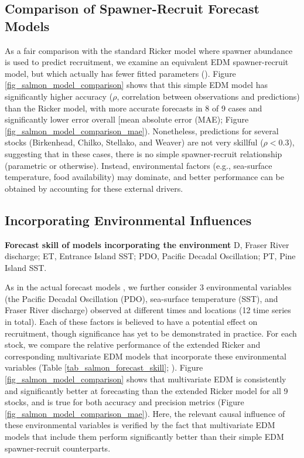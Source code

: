 \subsection{Comparison of Spawner-Recruit Forecast Models}

As a fair comparison with the standard Ricker model where spawner abundance is used to predict recruitment, we examine an equivalent EDM spawner-recruit model, but which actually has fewer fitted parameters (). Figure \ref{fig_salmon_model_comparison} shows that this simple EDM model has significantly higher accuracy ($\rho$, correlation between observations and predictions) than the Ricker model, with more accurate forecasts in 8 of 9 cases and significantly lower error overall [mean absolute error (MAE); Figure \ref{fig_salmon_model_comparison_mae}). Nonetheless, predictions for several stocks (Birkenhead, Chilko, Stellako, and Weaver) are not very skillful ($\rho < 0.3$), suggesting that in these cases, there is no simple spawner-recruit relationship (parametric or otherwise). Instead, environmental factors (e.g., sea-surface temperature, food availability) may dominate, and better performance can be obtained by accounting for these external drivers.

\subsection{Incorporating Environmental Influences}

\begin{table}
\caption[Forecast skill of models incorporating the environment]{\textbf{Forecast skill of models incorporating the environment}\newline
D, Fraser River discharge; ET, Entrance Island SST; PDO, Pacific Decadal Oscillation; PT, Pine Island SST.} \label{tab_salmon_forecast_skill}

\begin{center}

\end{center}
\end{table}

As in the actual forecast models \cite{Grant_2010}, we further consider 3 environmental variables (the Pacific Decadal Oscillation (PDO), sea-surface temperature (SST), and Fraser River discharge) observed at different times and locations (12 time series in total). Each of these factors is believed to have a potential effect on recruitment, though significance has yet to be demonstrated in practice. For each stock, we compare the relative performance of the extended Ricker and corresponding multivariate EDM models that incorporate these environmental variables (Table \ref{tab_salmon_forecast_skill}; ). Figure \ref{fig_salmon_model_comparison} shows that multivariate EDM is consistently and significantly better at forecasting than the extended Ricker model for all 9 stocks, and is true for both accuracy and precision metrics (Figure \ref{fig_salmon_model_comparison_mae}). Here, the relevant causal influence of these environmental variables is verified by the fact that multivariate EDM models that include them perform significantly better than their simple EDM spawner-recruit counterparts.

